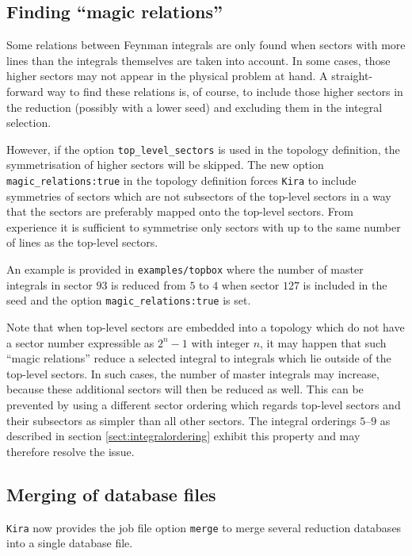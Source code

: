 \documentclass[a4paper,12pt]{article}
\newcommand*{\kira}{\texttt{Kira}}
\begin{document}
\subsection{Finding ``magic relations''}
\label{sect:magicrelations}

Some relations between Feynman integrals are only found when sectors with more
lines than the integrals themselves are taken into account.
In some cases, those higher sectors may not appear in the physical problem at
hand.
A straight-forward way to find these relations is, of course, to include those
higher sectors in the reduction (possibly with a lower seed) and excluding them
in the integral selection.

However, if the option \texttt{top\_level\_sectors} is used in the topology
definition, the symmetrisation of higher sectors will be skipped.
The new option \texttt{magic\_relations:\;true} in the topology definition
forces \kira{} to include symmetries of sectors which are not subsectors of the
top-level sectors in a way that the sectors are preferably mapped onto the
top-level sectors.
From experience it is sufficient to symmetrise only sectors with up to the same
number of lines as the top-level sectors.

An example is provided in \texttt{examples/topbox} where the number of master
integrals in sector $93$ is reduced from $5$ to $4$ when sector $127$ is
included in the seed and the option \texttt{magic\_relations:\;true} is set.

Note that when top-level sectors are embedded into a topology which do not have
a sector number expressible as $2^n-1$ with integer $n$, it may happen that such
``magic relations'' reduce a selected integral to integrals which lie outside of
the top-level sectors. In such cases, the number of master integrals may
increase, because these additional sectors will then be reduced as well. This
can be prevented by using a different sector ordering which regards top-level
sectors and their subsectors as simpler than all other sectors. The integral
orderings $5$--$9$ as described in section \ref{sect:integralordering} exhibit
this property and may therefore resolve the issue.


\subsection{Merging of database files}
\label{sect:merge}

\kira{} now provides the job file option \texttt{merge} to merge several
reduction databases into a single database file.
\end{document}
